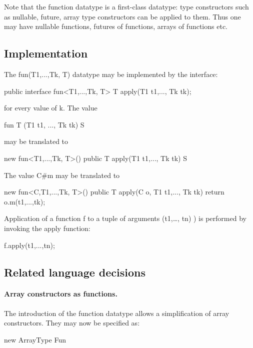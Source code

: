 Note that the function datatype is a first-class datatype: type
constructors such as nullable, future, array type constructors can be
applied to them. Thus one may have nullable functions, futures of
functions, arrays of functions etc.

\subsection{Implementation}

The {\cf fun(T1,...,Tk, T)} datatype may be implemented by the interface:
\begin{x10}
    public interface fun<T1,...,Tk, T> {
        T apply(T1 t1,..., Tk tk);
    }
\end{x10}
\noindent for every value of {\cf k}. The value
\begin{x10}
    fun T (T1 t1, ..., Tk tk) {S}
\end{x10}
may be translated to
\begin{x10}
    new fun<T1,...,Tk, T>() {
       public T apply(T1 t1,..., Tk tk) {
         S
       }
    }  
\end{x10}

The value {\cf C\#m} may be translated to

\begin{x10}
    new fun<C,T1,...,Tk, T>() {
       public T apply(C o, T1 t1,..., Tk tk) {
         return o.m(t1,...,tk);
       }
    }
\end{x10}

Application of a function {\cf f} to a tuple of arguments {\cf
(t1,\ldots, tn)} ) is performed by invoking the {\cf apply} function:

\begin{x10}
  f.apply(t1,...,tn);
\end{x10}

\subsection{Related language decisions}

\paragraph{Array constructors as functions.}

The introduction of the function datatype allows a simplification of
array constructors. They may now be specified as:

\begin{x10}
    new ArrayType Fun  
\end{x10}

